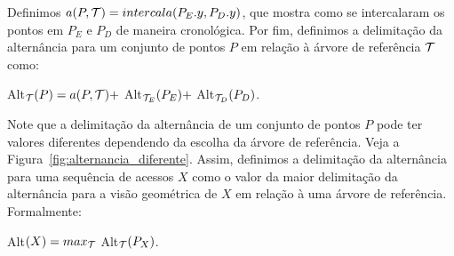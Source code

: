 Definimos $a(P,\mathcal{T}) = intercala(P_E.y, P_D.y)$, que mostra como se intercalaram os pontos em $P_E$ e $P_D$ de maneira cronológica. Por fim, definimos a delimitação da alternância para um conjunto de pontos $P$ em relação à árvore de referência $\mathcal{T}$ como:

Alt$_{\mathcal{T}}(P) = a(P,\mathcal{T}) +$ Alt$_{\mathcal{T}_E}(P_E) + $ Alt$_{\mathcal{T}_D}(P_D)$.

Note que a delimitação da alternância de um conjunto de pontos $P$ pode ter valores diferentes dependendo da escolha da árvore de referência. Veja a Figura~\ref{fig:alternancia_diferente}. Assim, definimos a delimitação da alternância para uma sequência de acessos $X$ como o valor da maior delimitação da alternância para a visão geométrica de $X$ em relação à uma árvore de referência. Formalmente: 

Alt$(X) = max_{\mathcal{T}}$ Alt$_{\mathcal{T}}(P_X)$.

